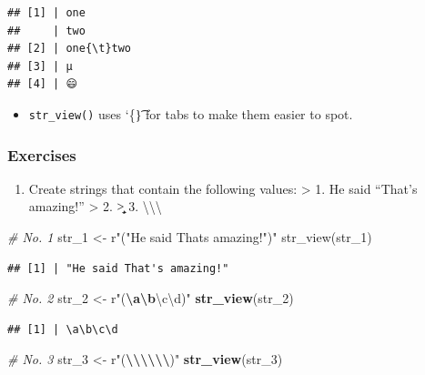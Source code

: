 \documentclass[
]{article}
\newenvironment{Shaded}{\begin{snugshade}}{\end{snugshade}}
\newcommand{\CommentTok}[1]{\textcolor[rgb]{0.56,0.35,0.01}{\textit{#1}}}
\newcommand{\FunctionTok}[1]{\textcolor[rgb]{0.13,0.29,0.53}{\textbf{#1}}}
\newcommand{\NormalTok}[1]{#1}
\newcommand{\OtherTok}[1]{\textcolor[rgb]{0.56,0.35,0.01}{#1}}
\newcommand{\SpecialCharTok}[1]{\textcolor[rgb]{0.81,0.36,0.00}{\textbf{#1}}}
\newcommand{\StringTok}[1]{\textcolor[rgb]{0.31,0.60,0.02}{#1}}
\providecommand{\tightlist}{%
  \setlength{\itemsep}{0pt}\setlength{\parskip}{0pt}}
\begin{document}
\begin{verbatim}
## [1] | one
##     | two
## [2] | one{\t}two
## [3] | µ
## [4] | 😄
\end{verbatim}

\begin{itemize}
\tightlist
\item
  \texttt{str\_view()} uses `\{\t\} for tabs to make them easier to
  spot.
\end{itemize}

\subsubsection{Exercises}\label{exercises}

\begin{enumerate}
\def\labelenumi{\arabic{enumi}.}
\tightlist
\item
  Create strings that contain the following values: \textgreater{} 1. He
  said ``That's amazing!'' \textgreater{} 2. \a\b\c\d
  > 3. \textbackslash\textbackslash\textbackslash{}
\end{enumerate}

\begin{Shaded}
\begin{Highlighting}[]
\CommentTok{\# No. 1}
\NormalTok{str\_1 }\OtherTok{\textless{}{-}}\NormalTok{ r}\StringTok{"("}\NormalTok{He said That}\StringTok{\textquotesingle{}s amazing!")"}
\StringTok{str\_view(str\_1)}
\end{Highlighting}
\end{Shaded}

\begin{verbatim}
## [1] | "He said That's amazing!"
\end{verbatim}

\begin{Shaded}
\begin{Highlighting}[]
\CommentTok{\# No. 2}
\NormalTok{str\_2 }\OtherTok{\textless{}{-}}\NormalTok{ r}\StringTok{"(}\SpecialCharTok{\textbackslash{}a\textbackslash{}b}\StringTok{\textbackslash{}c\textbackslash{}d)"}
\FunctionTok{str\_view}\NormalTok{(str\_2)}
\end{Highlighting}
\end{Shaded}

\begin{verbatim}
## [1] | \a\b\c\d
\end{verbatim}

\begin{Shaded}
\begin{Highlighting}[]
\CommentTok{\# No. 3}
\NormalTok{str\_3 }\OtherTok{\textless{}{-}}\NormalTok{ r}\StringTok{"(}\SpecialCharTok{\textbackslash{}\textbackslash{}\textbackslash{}\textbackslash{}\textbackslash{}\textbackslash{}}\StringTok{)"}
\FunctionTok{str\_view}\NormalTok{(str\_3)}
\end{Highlighting}
\end{Shaded}
\end{document}
